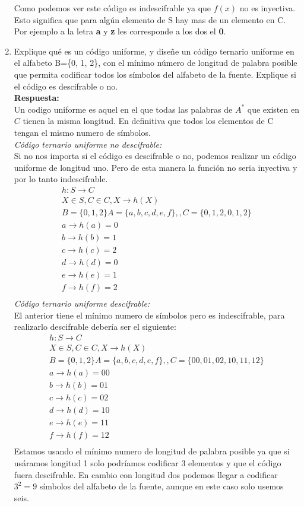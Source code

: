 \documentclass[12pt,a4paper]{article}
\begin{document}
\begin{enumerate}
Como podemos ver este código es indescifrable ya que $f(x)$ no es inyectiva. Esto significa que para algún elemento de S hay mas de un elemento en C. Por ejemplo a la letra \textbf{a} y \textbf{z} les corresponde a los dos el \textbf{0}.
\item Explique qué es un código uniforme, y diseñe un código ternario uniforme en el alfabeto B=\{0, 1, 2\}, con el mínimo número de longitud de palabra posible que permita codificar todos los símbolos del alfabeto de la fuente. Explique si el código es descifrable o no.\\
\textbf{Respuesta:}\\
Un codigo uniforme es aquel en el que todas las palabras de $A^{*}$ que existen en $C$ tienen la misma longitud. En definitiva que todos los elementos de C tengan el mismo numero de símbolos.\\
\textsl{Código ternario uniforme no descifrable:}\\
Si no nos importa si el código es descifrable o no, podemos realizar un código uniforme de longitud uno. Pero de esta manera la función no seria inyectiva y por lo tanto indescifrable. 
		$$
\begin{array}{c}{h: S \rightarrow C} \\ {X \in S, C \in C, X \rightarrow h(X)}		\\B=\{0,1,2\} A=\{a,b,c,d,e,f\},,C=\{0,1,2,0,1,2\}\\
a\rightarrow h(a) = 0\\
b\rightarrow h(b) = 1\\
c\rightarrow h(c) = 2\\
d\rightarrow h(d) = 0\\
e\rightarrow h(e) = 1\\
f\rightarrow h(f) = 2\\
\end{array}
$$
\textsl{Código ternario uniforme descifrable:}\\
El anterior tiene el mínimo numero de símbolos pero es indescifrable, para realizarlo descifrable debería ser el siguiente:
		$$
\begin{array}{c}{h: S \rightarrow C} \\ {X \in S, C \in C, X \rightarrow h(X)}		\\B=\{0,1,2\} A=\{a,b,c,d,e,f\},,C=\{00,01,02,10,11,12\}\\
a\rightarrow h(a) = 00\\
b\rightarrow h(b) = 01\\
c\rightarrow h(c) = 02\\
d\rightarrow h(d) = 10\\
e\rightarrow h(e) = 11\\
f\rightarrow h(f) = 12\\
\end{array}
$$
Estamos usando el mínimo numero de longitud de palabra posible ya que si usáramos longitud 1 solo podríamos codificar 3 elementos y que el código fuera descifrable. En cambio con longitud dos podemos llegar a codificar $3^2=9$ símbolos del alfabeto de la fuente, aunque en este caso solo usemos seis.


\end{enumerate}
\end{document}
